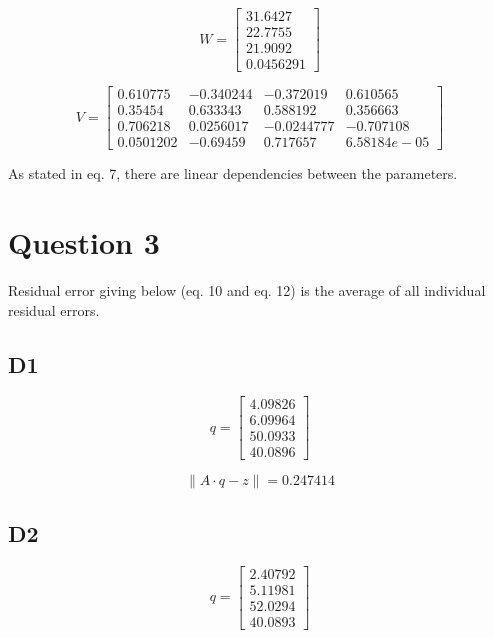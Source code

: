 \begin{equation}
W=\begin{bmatrix} 31.6427 \\ 22.7755 \\ 21.9092 \\ 0.0456291  \end{bmatrix}
\label{eq:} 
\end{equation}

\begin{equation}
V=\begin{bmatrix}  

0.610775 & -0.340244 & -0.372019 & 0.610565 \\
0.35454 & 0.633343 & 0.588192 & 0.356663 \\
0.706218 & 0.0256017 & -0.0244777 & -0.707108 \\
0.0501202 & -0.69459 & 0.717657 & 6.58184e-05  \end{bmatrix}
\label{eq:} 
\end{equation}

As stated in eq. 7, there are linear dependencies between the parameters.

\section*{Question 3}
Residual error giving below (eq. 10 and eq. 12) is the average of all individual residual errors. 

\subsection*{D1}
\begin{equation}
q=\begin{bmatrix} 4.09826 \\ 6.09964 \\ 50.0933 \\ 40.0896  \end{bmatrix}
\label{eq:} 
\end{equation}

\begin{equation}
\left\| A\cdot q-z \right\| = 0.247414
\label{eq:} 
\end{equation}


\subsection*{D2}

\begin{equation}
q=\begin{bmatrix} 2.40792 \\ 5.11981 \\ 52.0294 \\ 40.0893  \end{bmatrix}
\label{eq:} 
\end{equation}

